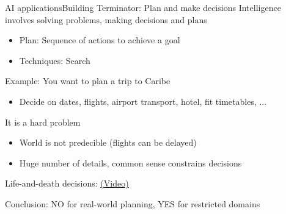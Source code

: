 \documentclass[10pt,compress]{beamer} %
\begin{document}
%

\begin{frame}{AI applications}{Building Terminator: Plan and make decisions}
	Intelligence involves solving problems, making decisions and plans
	\begin{itemize}
		\item Plan: Sequence of actions to achieve a goal
		\item Techniques: Search
	\end{itemize}
	Example: You want to plan a trip to Caribe
	\begin{itemize}
		\item Decide on dates, flights, airport transport, hotel, fit timetables, ...
	\end{itemize}
	It is a hard problem
	\begin{itemize}
		\item World is not predecible (flights can be delayed)
		\item Huge number of details, common sense constrains decisions
	\end{itemize}
	Life-and-death decisions: \href{https://www.youtube.com/watch?v=ixIoDYVfKA0}{(Video)}

	Conclusion: NO for real-world planning, YES for restricted domains
\end{frame}
\end{document}
